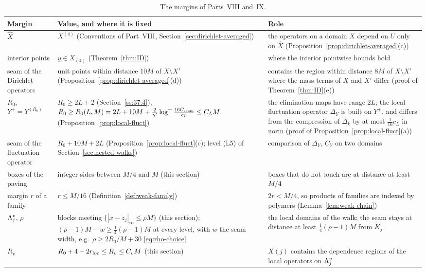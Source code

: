 \begin{table}[tbp]
\centering\small
\begin{tabular}{|p{}|p{}|p{}|}
\hline
Margin & Value, and where it is fixed & Role\tabularnewline
\hline
$\hat X$ & \raggedright $X^{(4)}$ (Conventions of Part~VIII, Section~\ref{sec:dirichlet-averaged}) & \raggedright the operators on a domain $X$ depend on $U$ only on $\hat X$ (Proposition~\ref{prop:dirichlet-averaged}(c))\tabularnewline
\hline
interior points & \raggedright $y\in X_{(4)}$ (Theorem~\ref{thm:ID}) & \raggedright where the interior pointwise bounds hold\tabularnewline
\hline
\raggedright seam of the Dirichlet operators & \raggedright unit points within distance $10M$ of $X\setminus X'$ (Proposition~\ref{prop:dirichlet-averaged}(d)) & \raggedright contains the region within distance $8M$ of $X\setminus X'$ where the mass terms of $X$ and $X'$ differ (proof of Theorem~\ref{thm:ID}(e))\tabularnewline
\hline
$R_0$, $Y^+=Y^{(R_0)}$ & \raggedright $R_0\ge2L+2$ (Section~\ref{ss:37.4}), $R_0\ge R_0(L,M)=2L+10M+\frac2{\gamma'}\log^+\frac{16C_{\rm seam}}{c_L}\le C_LM$ (Proposition~\ref{prop:local-fluct}) & \raggedright the elimination maps have range $2L$; the local fluctuation operator $\Delta_Y$ is built on $Y^+$, and differs from the compression of $\Delta_k$ by at most $\frac1{16}c_L$ in norm (proof of Proposition~\ref{prop:local-fluct}(a))\tabularnewline
\hline
\raggedright seam of the fluctuation operator & \raggedright $R_0+10M+2L$ (Proposition~\ref{prop:local-fluct}(c); level (L5) of Section~\ref{sec:nested-walks}) & \raggedright comparison of $\Delta_Y$, $C_Y$ on two domains\tabularnewline
\hline
\raggedright boxes of the paving & \raggedright integer sides between $M/4$ and $M$ (this section) & \raggedright boxes that do not touch are at distance at least $M/4$\tabularnewline
\hline
\raggedright margin $r$ of a family & \raggedright $r\le M/16$ (Definition~\ref{def:weak-family}) & \raggedright $2r<M/4$, so products of families are indexed by polymers (Lemma~\ref{lem:weak-chain})\tabularnewline
\hline
$\Lambda^v_j$, $\rho$ & \raggedright blocks meeting $\{|x-z_j|_\infty\le\rho M\}$ (this section); $(\rho-1)M-w\ge\frac14(\rho-1)M$ at every level, with $w$ the seam width, e.g.\ $\rho\ge2R_0/M+30$ \eqref{eq:rho-choice} & \raggedright the local domains of the walk; the seam stays at distance at least $\frac14(\rho-1)M$ from $K_j$\tabularnewline
\hline
$R_v$ & \raggedright $R_0+4+2r_{\rm loc}\le R_v\le C_vM$ (this section) & \raggedright $X(j)$ contains the dependence regions of the local operators on $\Lambda^v_j$\tabularnewline
\hline
\end{tabular}
\caption{The margins of Parts~VIII and~IX.}\label{tab:margins}
\end{table}

